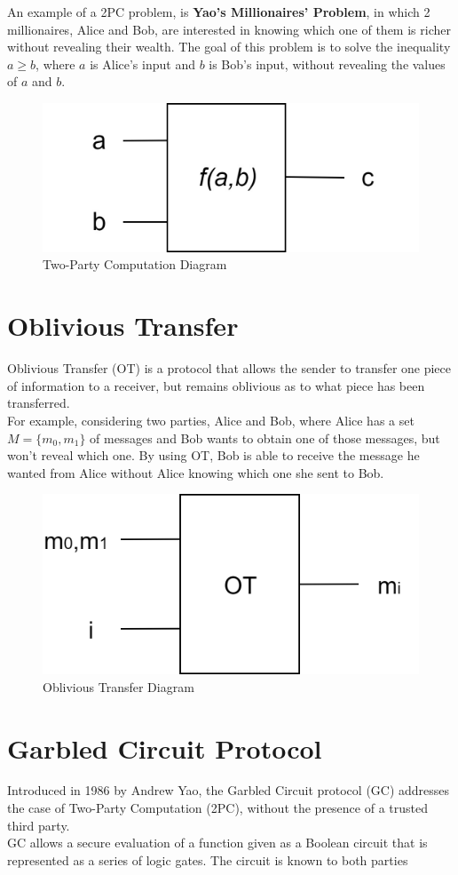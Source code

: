 An example of a 2PC problem, is \textbf{Yao's Millionaires' Problem}, in which 2 millionaires, Alice and Bob, are
interested in knowing which one of them is richer without revealing their wealth. The goal of this problem is to solve
the inequality $a\geq b$, where $a$ is Alice's input and $b$ is Bob's input, without revealing the values
of $a$ and $b$.

\renewcommand{\figurename}{Figure}
\begin{figure}[H]
\centering
\includegraphics[width=.4\linewidth]{./figures/mpc/two_party_computation_scheme}
\caption{Two-Party Computation Diagram}
\label{fig:tpcscheme}
\end{figure}

\section{Oblivious Transfer}
Oblivious Transfer (OT) is a protocol that allows the sender to transfer one piece of information
to a receiver, but remains oblivious as to what piece has been transferred.\\
For example, considering two parties, Alice and Bob, where Alice has a set $M = \{m_0,m_1\}$ of messages
and Bob wants to obtain one of those messages, but won't reveal which one. By using OT, Bob is able to
receive the message he wanted from Alice without Alice knowing which one she sent to Bob.

\renewcommand{\figurename}{Figure}
\begin{figure}[H]
\centering
\includegraphics[width=.4\linewidth]{./figures/mpc/OT}
\caption{Oblivious Transfer Diagram}
\label{fig:otscheme}
\end{figure}

\section{Garbled Circuit Protocol}
Introduced in 1986 by Andrew Yao, the Garbled Circuit protocol (GC) addresses the case
of Two-Party Computation (2PC), without the presence of a trusted third party.\\
GC allows a secure evaluation of a function given as a Boolean circuit that is represented as a series of logic gates.
The circuit is known to both parties\\

